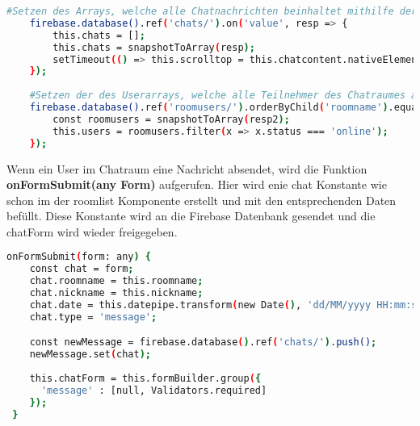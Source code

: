 \begin{lstlisting}[language=bash]
    #Setzen des Arrays, welche alle Chatnachrichten beinhaltet mithilfe der snapshot Konstante
    firebase.database().ref('chats/').on('value', resp => {
        this.chats = [];
        this.chats = snapshotToArray(resp);
        setTimeout(() => this.scrolltop = this.chatcontent.nativeElement.scrollHeight, 500);
    });
    
    #Setzen der des Userarrays, welche alle Teilnehmer des Chatraumes angibt
    firebase.database().ref('roomusers/').orderByChild('roomname').equalTo(this.roomname).on('value', (resp2: any) => {
        const roomusers = snapshotToArray(resp2);
        this.users = roomusers.filter(x => x.status === 'online');
    });
\end{lstlisting}

Wenn ein User im Chatraum eine Nachricht absendet, wird die Funktion \textbf{onFormSubmit(any Form)} aufgerufen.
Hier wird enie chat Konstante wie schon im der roomlist Komponente erstellt und mit den entsprechenden Daten befüllt. Diese Konstante wird an die Firebase Datenbank gesendet und die chatForm
wird wieder freigegeben.

\begin{lstlisting}[language=bash]
onFormSubmit(form: any) {
    const chat = form;
    chat.roomname = this.roomname;
    chat.nickname = this.nickname;
    chat.date = this.datepipe.transform(new Date(), 'dd/MM/yyyy HH:mm:ss');
    chat.type = 'message';

    const newMessage = firebase.database().ref('chats/').push();
    newMessage.set(chat);
    
    this.chatForm = this.formBuilder.group({
      'message' : [null, Validators.required]
    });
 }
\end{lstlisting}

\newpage